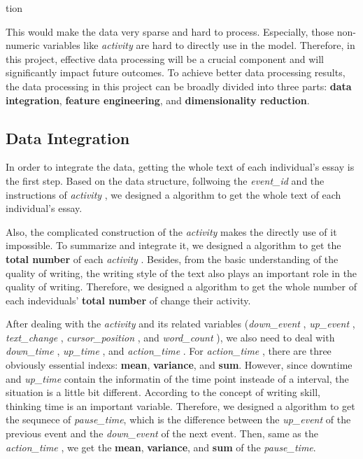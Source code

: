 tion\documentclass[8pt]{article}
\def\activity{\textit{activity} }
\def\down{\textit{down\_event} }
\def\up{\textit{up\_event} }
\def\textchange{\textit{text\_change} }
\def\cursor{\textit{cursor\_position} }
\def\wordcount{\textit{word\_count} }
\def\eventid{\textit{event\_id} }
\def\downtime{\textit{down\_time} }
\def\uptime{\textit{up\_time} }
\def\actiontime{\textit{action\_time} }
\begin{document}
This would make the data very sparse and hard to process.
Especially, those non-numeric variables like \activity are hard to directly use in the model. 
Therefore, in this project, effective data processing will be a crucial component and will significantly impact future outcomes.
To achieve better data processing results, the data processing in this project can be broadly divided into three parts: \textbf{data integration}, \textbf{feature engineering}, and \textbf{dimensionality reduction}.

\subsection{Data Integration}
In order to integrate the data, getting the whole text of each individual's essay is the first step.
Based on the data structure, follwoing the \eventid and the instructions of \activity, we designed a algorithm to get the whole text of each individual's essay.

Also, the complicated construction of the \activity makes the directly use of it impossible. To summarize and integrate it, we designed a algorithm to get the \textbf{total number} of each \activity.
Besides, from the basic understanding of the quality of writing, the writing style of the text also plays an important role in the quality of writing.
Therefore, we designed a algorithm to get the whole number of each indeviduals' \textbf{total number} of change their activity.

After dealing with the \activity and its related variables (\down , \up , \textchange , \cursor , and \wordcount), we also need to deal with \downtime , \uptime , and \actiontime . 
For \actiontime , there are three obviously essential indexs: \textbf{mean}, \textbf{variance}, and \textbf{sum}.
However, since downtime and \uptime contain the informatin of the time point insteade of a interval, the situation is a little bit different. 
According to the concept of writing skill, thinking time is an important variable.
Therefore, we designed a algorithm to get the sequnece of \textit{pause\_time}, which is the difference between the \up of the previous event and the \down of the next event.
Then, same as the \actiontime , we get the \textbf{mean}, \textbf{variance}, and \textbf{sum} of the \textit{pause\_time}.

\end{document}

